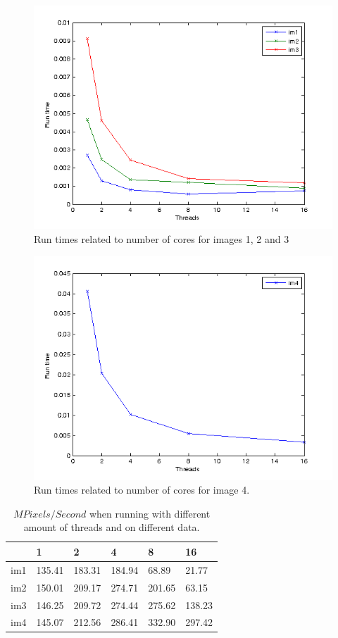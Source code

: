 \documentclass[a4paper,11pt]{article}
\begin{document}
\begin{figure}[!h]
  \caption{Run times related to number of cores for images 1, 2 and 3}
  \label{thresc_123}
  \includegraphics[scale=0.9]{../plots/pthread_im123.png}
\end{figure}
\begin{figure}[!h]
  \caption{Run times related to number of cores for image 4.}
  \label{thresc_4}
  \includegraphics[scale=0.9]{../plots/pthread_im4.png}
\end{figure}

\begin{table}[h!]
  \label{mpixelspersecond}
  \caption{$MPixels/Second$ when running with different amount of threads and on different data.}
  \begin{tabular}[h]{|l|l|l|l|l|l|}
    \hline
                  & 1     & 2     & 4     & 8     & 16\\
    \hline
    im1           & 135.41 & 183.31 & 184.94 & 68.89  & 21.77\\ 
    im2           & 150.01 & 209.17 & 274.71 & 201.65 & 63.15\\ 
    im3           & 146.25 & 209.72 & 274.44 & 275.62 & 138.23\\ 
    im4           & 145.07 & 212.56 & 286.41 & 332.90 & 297.42\\
    \hline
  \end{tabular}
\end{table}
\end{document}
